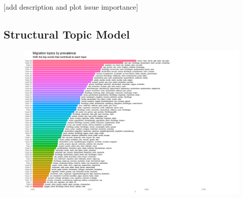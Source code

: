 \documentclass{article}
\begin{document}
[add description and plot issue importance]

\subsection{Structural Topic Model}\label{app:stm}

\begin{figure}[!ht]
    \centering
    \includegraphics[width=2\textwidth]{paper/vis/mig_topics_plot.png}
    \label{fig:did_corr}
\end{figure}
\end{document}
